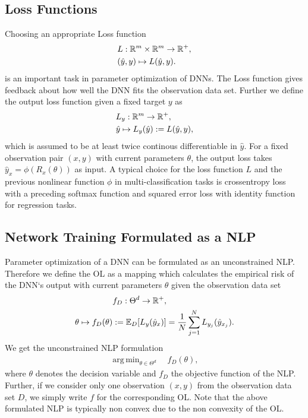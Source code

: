 \documentclass[conference]{IEEEtran}
\DeclareMathOperator*{\argmin}{arg\,min}
\begin{document}
	\subsection{Loss Functions}
	\noindent
	Choosing an appropriate Loss function
	\begin{align}
	&L:\mathbb{R}^{m}\times \mathbb{R}^{m}\rightarrow \mathbb{R}^{+}, \notag\\
	&(\hat{y}, y)\mapsto L(\hat{y}, y).
	\end{align}
	is an important task in parameter optimization of DNNs. The Loss function gives feedback about how well the DNN fits the observation data set. Further we define the output loss function given a fixed target $y$ as
	\begin{align}
	&L_{y}:\mathbb{R}^{m}\rightarrow \mathbb{R}^{+}, \notag\\
	&\hat{y}\mapsto L_{y}(\hat{y}) := L(\hat{y}, y),
	\end{align}
	which is assumed to be at least twice continous differentiable in $\hat{y}$. For a fixed observation pair $(x, y)$ with current parameters $\theta$, the output loss takes $\hat{y}_{x} = \phi(R_{x}(\theta))$ as input. A typical choice for the loss function $L$ and the previous nonlinear function $\phi$ in multi-classification tasks is crossentropy loss with a preceding softmax function and squared error loss with identity function for regression tasks.



	\subsection{Network Training Formulated as a NLP}
	\noindent
	Parameter optimization of a DNN can be formulated as an unconstrained NLP. Therefore we define the OL as a mapping which calculates the empirical risk of the DNN`s output with current parameters $\theta$ given the observation data set
	\begin{align}
	&f_{D}:\Theta^{d}\rightarrow\mathbb{R}^{+}, \notag\\
	\theta\mapsto f_{D}(\theta) &:= \mathbb{E}_{D}[L_{y}(\hat{y}_{x})] =  \frac{1}{N}\sum_{j = 1}^{N}L_{y_{j}}(\hat{y}_{x_{j}}).
	\end{align}
	We get the unconstrained NLP formulation
	\begin{align}
	\argmin_{\theta\in\Theta^{d}}\quad f_{D}(\theta),
	\end{align}
	where $\theta$ denotes the decision variable and $f_{D}$ the objective function of the NLP.
	Further, if we consider only one observation $(x, y)$ from the observation data set $D$, we simply write  $f$ for the corresponding OL. Note that the above formulated NLP is typically non convex due to the non convexity of the OL.
\end{document}
